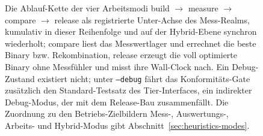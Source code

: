 \begin{nurkurz}
\begin{figure}[htbp]
\caption{Die Ablauf-Kette der vier Arbeitsmodi build $\to$ measure $\to$ compare $\to$ release als registrierte Unter-Achse des Mess-Realms, kumulativ in dieser Reihenfolge und auf der Hybrid-Ebene synchron wiederholt; compare liest das Messwertlager und errechnet die beste Binary bzw. Rekombination, release erzeugt die voll optimierte Binary ohne Messfühler und misst ihre Wall-Clock nach. Ein Debug-Zustand existiert nicht; unter \texttt{--debug} fährt das Konformitäts-Gate zusätzlich den Standard-Testsatz des Tier-Interfaces, ein indirekter Debug-Modus, der mit dem Release-Bau zusammenfällt. Die Zuordnung zu den Betriebs-Zielbildern Mess-, Auswertungs-, Arbeits- und Hybrid-Modus gibt Abschnitt~\ref{sec:heuristics-modes}.}\label{fig:modi-kette}
\end{figure}
\end{nurkurz}

